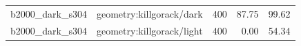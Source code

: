 \begin{longtable}{l>{\raggedright\arraybackslash}p{.42\linewidth}rrr}
b2000\_\allowbreak{}dark\_\allowbreak{}s304 & %
geometry:killgorack/dark & %
400 & %
87.75 & %
99.62 \\ %

b2000\_\allowbreak{}dark\_\allowbreak{}s304 & %
geometry:killgorack/light & %
400 & %
0.00 & %
54.34 \\ %


\end{longtable}
